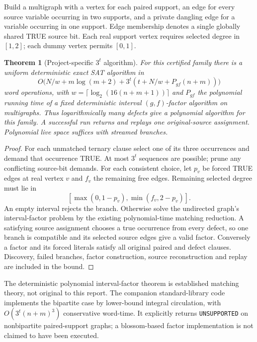 \documentclass[10pt]{article}
\newtheorem{theorem}{Theorem}
\begin{document}
Build a multigraph with a vertex for each paired support, an edge for every source variable occurring in two supports, and a private dangling edge for a variable occurring in one support. Edge membership denotes a single globally shared TRUE source bit. Each real support vertex requires selected degree in $[1,2]$; each dummy vertex permits $[0,1]$.

\begin{theorem}[Project-specific $3^t$ algorithm]
For this certified family there is a uniform deterministic exact SAT algorithm in
\[
O\bigl(N/w+m\log(m+2)+3^t(t+N/w+P_{gf}(n+m))\bigr)
\]
word operations, with $w=\lceil\log_2(16(n+m+1))\rceil$ and $P_{gf}$ the polynomial running time of a \emph{fixed deterministic} interval $(g,f)$-factor algorithm on multigraphs. Thus logarithmically many defects give a polynomial algorithm for this family. A successful run returns and replays one original-source assignment. Polynomial live space suffices with streamed branches.
\end{theorem}
\begin{proof}
For each unmatched ternary clause select one of its three occurrences and demand that occurrence TRUE. At most $3^t$ sequences are possible; prune any conflicting source-bit demands. For each consistent choice, let $p_v$ be forced TRUE edges at real vertex $v$ and $f_v$ the remaining free edges. Remaining selected degree must lie in
\[
[\max(0,1-p_v),\min(f_v,2-p_v)].
\]
An empty interval rejects the branch. Otherwise solve the undirected graph's interval-factor problem by the existing polynomial-time matching reduction. A satisfying source assignment chooses a true occurrence from every defect, so one branch is compatible and its selected source edges give a valid factor. Conversely a factor and its forced literals satisfy all original paired and defect clauses. Discovery, failed branches, factor construction, source reconstruction and replay are included in the bound.
\end{proof}
The deterministic polynomial interval-factor theorem is established matching theory, not original to this report. The companion standard-library code implements the bipartite case by lower-bound integral circulation, with $O(3^t(n+m)^3)$ conservative word-time. It explicitly returns \texttt{UNSUPPORTED} on nonbipartite paired-support graphs; a blossom-based factor implementation is not claimed to have been executed.
\end{document}
